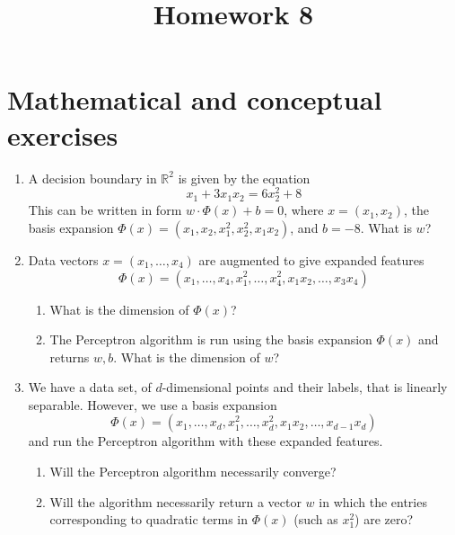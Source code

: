 \documentclass{article}
\title{Homework 8}
\author{}
\date{}
\begin{document}
\maketitle

\section*{Mathematical and conceptual exercises}

\begin{enumerate}
    \item A decision boundary in $\mathbb{R}^{2}$ is given by the equation
    \[
    x_{1} + 3 x_{1} x_{2} = 6 x_{2}^{2} + 8
    \]
    This can be written in form $w \cdot \Phi(x) + b = 0$, where $x = \left(x_{1}, x_{2}\right)$, the basis expansion $\Phi(x) = \left(x_{1}, x_{2}, x_{1}^{2}, x_{2}^{2}, x_{1} x_{2}\right)$, and $b = -8$. What is $w$?

    \item Data vectors $x = \left(x_{1}, \ldots, x_{4}\right)$ are augmented to give expanded features
    \[
    \Phi(x) = \left(x_{1}, \ldots, x_{4}, x_{1}^{2}, \ldots, x_{4}^{2}, x_{1} x_{2}, \ldots, x_{3} x_{4}\right)
    \]
    \begin{enumerate}
        \item What is the dimension of $\Phi(x)$?
        \item The Perceptron algorithm is run using the basis expansion $\Phi(x)$ and returns $w, b$. What is the dimension of $w$?
    \end{enumerate}

    \item We have a data set, of $d$-dimensional points and their labels, that is linearly separable. However, we use a basis expansion
    \[
    \Phi(x) = \left(x_{1}, \ldots, x_{d}, x_{1}^{2}, \ldots, x_{d}^{2}, x_{1} x_{2}, \ldots, x_{d-1} x_{d}\right)
    \]
    and run the Perceptron algorithm with these expanded features.
    \begin{enumerate}
        \item Will the Perceptron algorithm necessarily converge?
        \item Will the algorithm necessarily return a vector $w$ in which the entries corresponding to quadratic terms in $\Phi(x)$ (such as $x_{1}^{2}$) are zero?
    \end{enumerate}


\end{enumerate}
\end{document}
